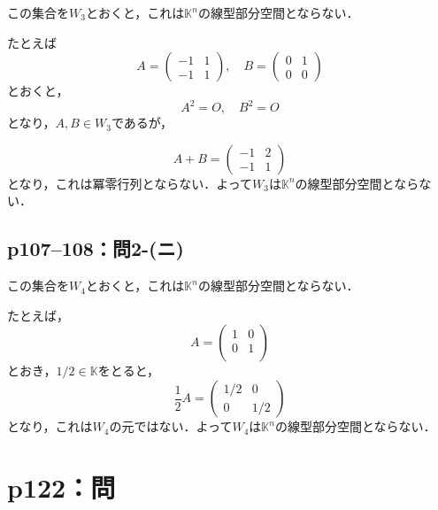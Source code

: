 \begin{tanswer}
  この集合を$W_3$とおくと，これは$\mathbb{K}^n$の線型部分空間とならない．

  たとえば
  \[
    A = \begin{pmatrix} -1 & 1 \\ -1 & 1 \end{pmatrix} , \quad B = \begin{pmatrix} 0 & 1 \\ 0 & 0 \end{pmatrix}
  \]
  とおくと，
  \[
    A^2 = O , \quad B^2 =O
  \]
  となり，$A ,B \in W_3$であるが，

  \[
    A+B = \begin{pmatrix} -1 & 2\\-1 & 1\end{pmatrix}
  \]
  となり，これは冪零行列とならない．よって$W_3$は$\mathbb{K}^n$の線型部分空間とならない．
\end{tanswer}

\subsection*{p107--108：問2-(ニ)}

\begin{tanswer}
  この集合を$W_4$とおくと，これは$\mathbb{K}^n$の線型部分空間とならない．

  たとえば，
  \[
    A= \begin{pmatrix} 1 & 0 \\ 0 & 1 \\ \end{pmatrix}
  \]
  とおき，$ 1/2 \in \mathbb{K}$をとると，
  \[
    \frac{1}{2} A = \begin{pmatrix} 1/2 & 0 \\ 0 & 1/2 \end{pmatrix}
  \]
  となり，これは$W_4$の元ではない．よって$W_4$は$\mathbb{K}^n$の線型部分空間とならない．
\end{tanswer}


\section*{p122：問}

